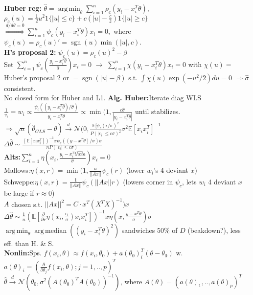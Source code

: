 \documentclass[11pt]{article}
\newcommand{\E}{\mathbb{E}}
\DeclareMathOperator*{\argmin}{arg\,min}
\DeclareMathOperator*{\med}{arg\,median}
\DeclareMathOperator*{\sgn}{sgn}
\begin{document}
\begin{multicols}{4}
\textbf{Huber reg:} $\hat{\theta}=\argmin_\theta\sum^n_{i=1}\rho_c(y_i-x_i^T\theta),$ $\rho_c(u)=\frac{1}{2}u^2 1\{|u|\leq c\}+c(|u|-\frac{c}{2})1\{|u|\geq c\}$\\
$\stackrel{d/d\theta=0}{\Rightarrow}\sum^n_{i=1}\psi_c(y_i-x_i^T\theta)x_i=0,$ where $\psi_c(u)=\rho_c(u)'=\sgn(u)\min(|u|,c)$.\\
\textbf{H's proposal 2:} $\psi_c(u)=\rho_c(u)^2-\beta$\\
Set $\sum^n_{i=1}\psi_c(\frac{y_i-x_i^T\hat{\theta}}{\hat{\sigma}})x_i=0$ $\rightarrow$ $\sum^n_{i=1}\chi(y_i-x_i^T\theta)x_i=0$ with $\chi(u)=$Huber's proposal 2 or $=\sgn(|u|-\beta)$ s.t. $\int\chi(u)\exp(-u^2/2)du=0$ $\Rightarrow \hat{\sigma}$ consistent.\\
No closed form for Huber and L1.
\textbf{Alg. Huber:}Iterate diag WLS $\frac{1}{v_i}=w_i\propto\frac{\psi_c((y_i-x_i^T\hat{\theta})/\hat{\sigma})}{y_i-x_i^T\hat{\theta}}\propto\min(1,\frac{c\hat{\sigma}}{|y_i-x_i^T\hat{\theta}|}$ until stabilizes.$\Rightarrow\sqrt{n}(\hat{\theta}_{GLS}-\theta)\stackrel{d}{\rightarrow}\mathcal{N}(0,\frac{\E[\psi_c(\epsilon/\sigma)^2}{P(|\epsilon_i|\leq c\sigma)^2}\sigma^2\E[x_ix_i^T]^{-1}$\\
$\Delta\hat{\theta}\sim\frac{(\E[x_ix_i^T])^{-1}x\psi_c((y-x^T\theta)/\sigma)\sigma}{nP(|\epsilon_i|\leq c\sigma)}$\\
\textbf{Alts:}$\sum^n_{i=1}\eta(x_i,\frac{y_i-x_i^T\hat{theta}}{\hat{\sigma}})x_i=0$\\
Mallows:$\eta(x,r)=\min(1,\frac{a}{||Ax||}\psi_c(r)$ (lower $w_i$'s 4 deviant $x$)\\
Schweppe:$\eta(x,r)=\frac{1}{||Ax||}\psi_c(||Ax||r)$ (lowers corner in $\psi_c$, lets $w_i$ 4 deviant $x$ be large if $r\approx 0$)\\
$A$ chosen s.t. $||Ax||^2=C\cdot x^T(X^TX)^{-1})x$\\
$\Delta\hat{\theta}\sim\frac{1}{n}(\E[\frac{\partial}{\partial r}\eta(x_i,\frac{\epsilon_i}{\sigma})x_ix_i^T])^{-1}x\eta(x,\frac{y-x^T\theta}{\sigma})\sigma$\\
$\argmin_\theta\med((y_i-x_i^T\theta)^2)$ sandwiches $50\%$ of $D$ (beakdown?), less eff. than H. \& S.\\
\textbf{Nonlin:}Sps. $f(x_i,\theta)\approx f(x_i,\theta_0)+a(\theta_0)^T_i(\theta-\theta_0)$ w. $a(\theta)_i=(\frac{\partial}{\partial\theta_j}f(x_i,\theta);j=1,..,p)^T$\\
$\hat{\theta}\stackrel{d}{\rightarrow}\mathcal{N}(\theta_0,\sigma^2(A(\theta_0)^T A(\theta_0))^{-1})$, where $A(\theta)=(a(\theta)_1,..,a(\theta)_p)^T$\\

\end{multicols}
\end{document}
